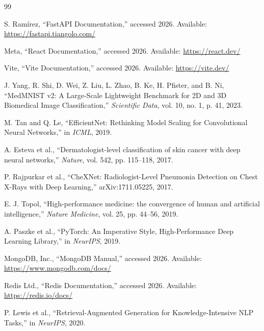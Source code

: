 \documentclass[conference]{IEEEtran}
\begin{document}
\begin{thebibliography}{99}

S. Ramírez, ``FastAPI Documentation,'' accessed 2026. Available: \url{https://fastapi.tiangolo.com/}

Meta, ``React Documentation,'' accessed 2026. Available: \url{https://react.dev/}

Vite, ``Vite Documentation,'' accessed 2026. Available: \url{https://vite.dev/}

J. Yang, R. Shi, D. Wei, Z. Liu, L. Zhao, B. Ke, H. Pfister, and B. Ni, ``MedMNIST v2: A Large-Scale Lightweight Benchmark for 2D and 3D Biomedical Image Classification,'' \emph{Scientific Data}, vol. 10, no. 1, p. 41, 2023.

M. Tan and Q. Le, ``EfficientNet: Rethinking Model Scaling for Convolutional Neural Networks,'' in \emph{ICML}, 2019.

A. Esteva et al., ``Dermatologist-level classification of skin cancer with deep neural networks,'' \emph{Nature}, vol. 542, pp. 115--118, 2017.

P. Rajpurkar et al., ``CheXNet: Radiologist-Level Pneumonia Detection on Chest X-Rays with Deep Learning,'' arXiv:1711.05225, 2017.

E. J. Topol, ``High-performance medicine: the convergence of human and artificial intelligence,'' \emph{Nature Medicine}, vol. 25, pp. 44--56, 2019.

A. Paszke et al., ``PyTorch: An Imperative Style, High-Performance Deep Learning Library,'' in \emph{NeurIPS}, 2019.

MongoDB, Inc., ``MongoDB Manual,'' accessed 2026. Available: \url{https://www.mongodb.com/docs/}

Redis Ltd., ``Redis Documentation,'' accessed 2026. Available: \url{https://redis.io/docs/}

P. Lewis et al., ``Retrieval-Augmented Generation for Knowledge-Intensive NLP Tasks,'' in \emph{NeurIPS}, 2020.

\end{thebibliography}
\end{document}
